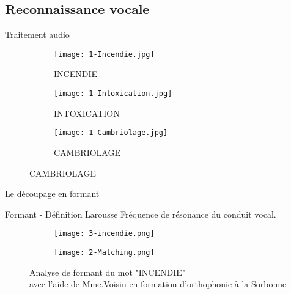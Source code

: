 \subsection{Reconnaissance vocale}

\begin{frame}{Traitement audio}
	\begin{figure}
		\begin{subfigure}[]{0.32\textwidth}
			\texttt{[image: 1-Incendie.jpg]}
			\caption{INCENDIE}
		\end{subfigure}
		\begin{subfigure}[]{0.32\textwidth}
			\texttt{[image: 1-Intoxication.jpg]}
			\caption{INTOXICATION}
		\end{subfigure}
		\begin{subfigure}[]{0.32\textwidth}
			\texttt{[image: 1-Cambriolage.jpg]}
			\caption{CAMBRIOLAGE}
		\end{subfigure}
	\end{figure}
\end{frame}



\begin{frame}{Le découpage en formant}
	\begin{block}{Formant - Définition Larousse}
		Fréquence de résonance du conduit vocal. \\
	\end{block}
	\begin{figure}
		\begin{center}


		\begin{subfigure}[]{0.5\textwidth}
			\centering
			\texttt{[image: 3-incendie.png]}
		\end{subfigure}
		\begin{subfigure}[]{0.5\textwidth}
			\centering
			\texttt{[image: 2-Matching.png]}
		\end{subfigure}
		\caption{Analyse de formant du mot "INCENDIE" \\avec l'aide de Mme.Voisin en formation d'orthophonie à la Sorbonne}
		\end{center}
	\end{figure}
\end{frame}
